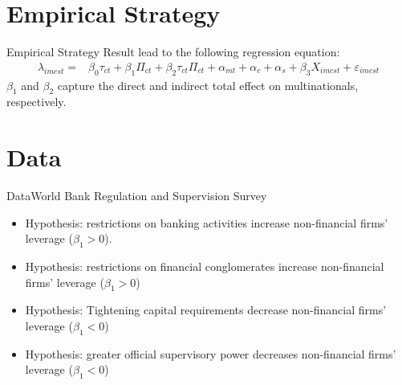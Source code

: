 \documentclass{beamer}
\begin{document}
\section{Empirical Strategy}
\begin{frame}{Empirical Strategy}
Result lead to the following regression equation:
\begin{equation}
\begin{aligned}
\lambda_{imcst}=&\beta_0\tau_{ct}+\beta_1\Pi_{ct}+\beta_2\tau_{ct}\Pi_{ct}+\alpha_{mt}+\alpha_{c}+\alpha_{s}+\beta_3X_{imcst}+\varepsilon_{imcst}
\label{eq:optimal leverage empirically 1}
\end{aligned}
\end{equation}
$\beta_1$ and $\beta_2$ capture the direct and indirect total effect on multinationals, respectively. 
\end{frame}

\section{Data}

\begin{frame}{Data}{World Bank Regulation
	and Supervision Survey \citep{barth2013bank}}

	\begin{itemize}
	\item Hypothesis: restrictions on banking activities increase non-financial firms' leverage ($\beta_1>0$).
	
\vspace{\baselineskip}

	\item Hypothesis: restrictions on financial conglomerates increase non-financial firms' leverage ($\beta_1>0$)
	
\vspace{\baselineskip}

	\item Hypothesis: Tightening capital requirements decrease non-financial firms' leverage ($\beta_1<0$)
	

\vspace{\baselineskip}

	\item Hypothesis: greater official supervisory power decreases non-financial firms' leverage ($\beta_1<0$)
	
\end{itemize}

\end{frame}
\end{document}
